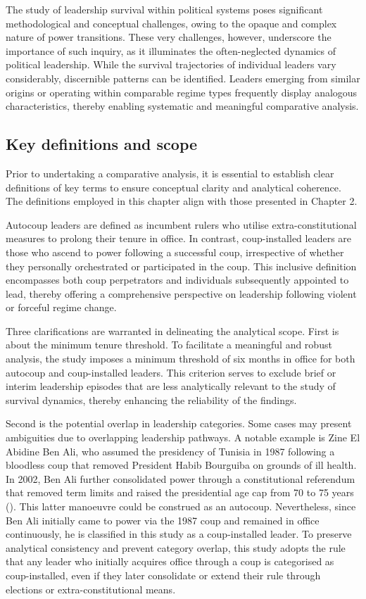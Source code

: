 \documentclass[
  12pt,
]{report}
\begin{document}
The study of leadership survival within political systems poses
significant methodological and conceptual challenges, owing to the
opaque and complex nature of power transitions. These very challenges,
however, underscore the importance of such inquiry, as it illuminates
the often-neglected dynamics of political leadership. While the survival
trajectories of individual leaders vary considerably, discernible
patterns can be identified. Leaders emerging from similar origins or
operating within comparable regime types frequently display analogous
characteristics, thereby enabling systematic and meaningful comparative
analysis.

\subsection{Key definitions and scope}\label{key-definitions-and-scope}

Prior to undertaking a comparative analysis, it is essential to
establish clear definitions of key terms to ensure conceptual clarity
and analytical coherence. The definitions employed in this chapter align
with those presented in Chapter 2.

Autocoup leaders are defined as incumbent rulers who utilise
extra-constitutional measures to prolong their tenure in office. In
contrast, coup-installed leaders are those who ascend to power following
a successful coup, irrespective of whether they personally orchestrated
or participated in the coup. This inclusive definition encompasses both
coup perpetrators and individuals subsequently appointed to lead,
thereby offering a comprehensive perspective on leadership following
violent or forceful regime change.

Three clarifications are warranted in delineating the analytical scope.
First is about the minimum tenure threshold. To facilitate a meaningful
and robust analysis, the study imposes a minimum threshold of six months
in office for both autocoup and coup-installed leaders. This criterion
serves to exclude brief or interim leadership episodes that are less
analytically relevant to the study of survival dynamics, thereby
enhancing the reliability of the findings.

Second is the potential overlap in leadership categories. Some cases may
present ambiguities due to overlapping leadership pathways. A notable
example is Zine El Abidine Ben Ali, who assumed the presidency of
Tunisia in 1987 following a bloodless coup that removed President Habib
Bourguiba on grounds of ill health. In 2002, Ben Ali further
consolidated power through a constitutional referendum that removed term
limits and raised the presidential age cap from 70 to 75 years
(). This latter
manoeuvre could be construed as an autocoup. Nevertheless, since Ben Ali
initially came to power via the 1987 coup and remained in office
continuously, he is classified in this study as a coup-installed leader.
To preserve analytical consistency and prevent category overlap, this
study adopts the rule that any leader who initially acquires office
through a coup is categorised as coup-installed, even if they later
consolidate or extend their rule through elections or
extra-constitutional means.
\end{document}

